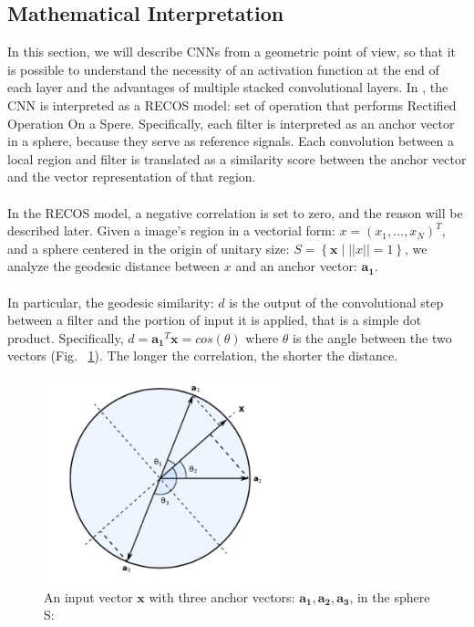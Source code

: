 \documentclass[LaM,binding=0.6cm]{sapthesis}
\begin{document}
\subsection{Mathematical Interpretation}
In this section, we will describe CNNs from a geometric point of view, so that it is possible to understand the necessity of an activation function at the end of each layer and the advantages of multiple stacked convolutional layers. In \cite{cnninter}, the CNN is interpreted as a RECOS model: set of operation that performs Rectified Operation On a Spere. Specifically, each filter is interpreted as an anchor vector in a sphere, because they serve as reference signals. Each convolution between a local region and filter is translated as a similarity score between the anchor vector and the vector representation of that region.\\\\In the RECOS model, a negative correlation is set to zero, and the reason will be described later. Given a image's region in a vectorial form: $x=(x_1,\dots,x_N)^T$, and a sphere centered in the origin of unitary size: $S=\left\{\boldsymbol{x}\mid ||x||=1\right\}$, we analyze the geodesic distance between $x$ and an anchor vector: $\boldsymbol{a_1}$.\\\\In particular, the geodesic similarity: $d$ is the output of the convolutional step between a filter and the portion of input it is applied, that is a simple dot product. Specifically, $d=\boldsymbol{a_1}^T \boldsymbol{x}=cos(\theta)$ where $\theta$ is the angle between the two vectors (Fig. ~\ref{fig:geocnn}). The longer the correlation, the shorter the distance.
\begin{figure}   \centering
    \includegraphics[width=70mm,scale=0.7]{geocnn}
    \caption{An input vector $\boldsymbol{x}$ with three anchor vectors: $\boldsymbol{a_1,a_2,a_3}$, in the sphere S: \cite{cnninter}}
    \label{fig:geocnn}
\end{figure}
\end{document}
